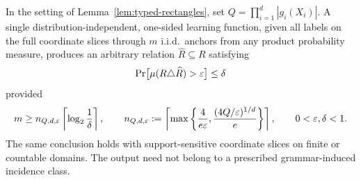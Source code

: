 \begin{theorem}
\label{thm:direct-improper-pac}
In the setting of Lemma~\ref{lem:typed-rectangles}, set
\(Q=\prod_{i=1}^{d}|g_i(X_i)|\).
A single distribution-independent, one-sided learning function,
given all labels on the full coordinate slices through \(m\)
i.i.d.\ anchors from any product probability measure, produces
an arbitrary relation \(\widehat R\subseteq R\) satisfying
\[
 \Pr\bigl[\mu(R\triangle\widehat R)>\varepsilon\bigr]\le\delta
\]
provided
\[
 m\ge n_{Q,d,\varepsilon}
 \left\lceil\log_2\frac1\delta\right\rceil,
 \qquad
 n_{Q,d,\varepsilon}:=
 \left\lceil
 \max\left\{
 \frac{4}{e\varepsilon},
 \frac{(4Q/\varepsilon)^{1/d}}{e}
 \right\}
 \right\rceil,
 \qquad 0<\varepsilon,\delta<1.
\]
The same conclusion holds with support-sensitive
coordinate slices on finite or countable domains.
The output need not belong to a prescribed grammar-induced
incidence class.
\end{theorem}
